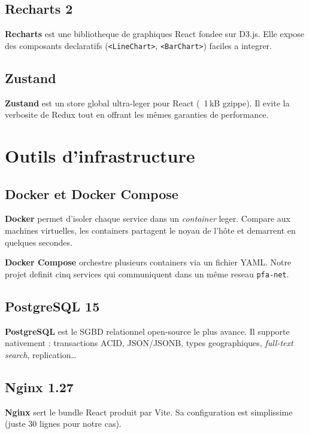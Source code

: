 \documentclass[12pt,a4paper,oneside]{report}
\begin{document}
\subsection{Recharts 2}

\textbf{Recharts} est une bibliotheque de graphiques React fondee sur D3.js.
Elle expose des composants declaratifs (\texttt{<LineChart>},
\texttt{<BarChart>}) faciles a integrer.

\subsection{Zustand}

\textbf{Zustand} est un store global ultra-leger pour React (~1\,kB
gzippe). Il evite la verbosite de Redux tout en offrant les m\^emes garanties
de performance.

\section{Outils d'infrastructure}

\subsection{Docker et Docker Compose}

\textbf{Docker} permet d'isoler chaque service dans un \emph{container}
leger. Compare aux machines virtuelles, les containers partagent le noyau
de l'h\^ote et demarrent en quelques secondes.

\textbf{Docker Compose} orchestre plusieurs containers via un fichier YAML.
Notre projet definit cinq services qui communiquent dans un m\^eme reseau
\texttt{pfa-net}.

\subsection{PostgreSQL 15}

\textbf{PostgreSQL} est le SGBD relationnel open-source le plus avance. Il
supporte nativement : transactions ACID, JSON/JSONB, types geographiques,
\emph{full-text search}, replication\dots

\subsection{Nginx 1.27}

\textbf{Nginx} sert le bundle React produit par Vite. Sa configuration est
simplissime (juste 30 lignes pour notre cas).
\end{document}
